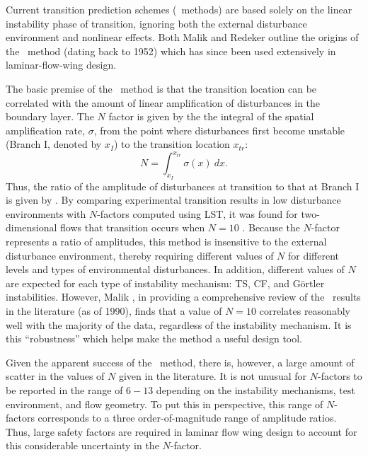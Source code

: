 Current transition prediction schemes (\eton\ methods) are based solely on the
linear instability phase of transition, ignoring both the external disturbance
environment and nonlinear effects.  Both Malik \cite{Malik:90a} and Redeker
\etal \cite{ReHoKoQu:86} outline the origins of the \eton\ method (dating back
to 1952) which has since been used extensively in laminar-flow-wing design.


The basic premise of the \eton\ method is that the transition location can be
correlated with the amount of linear amplification of disturbances in the
boundary layer.  The $N$ factor is given by the the integral of the spatial
amplification rate, $\sigma$, from the point where disturbances first become
unstable (Branch I, denoted by $x_I$) to the transition location $x_{tr}$:
%
\begin{equation}
  N = \int_{x_I}^{x_{tr}} \sigma(x) \ dx .
\end{equation}
%
Thus, the ratio of the amplitude of disturbances at transition to that at
Branch I is given by \eton.  By comparing experimental transition results in
low disturbance environments with $N$-factors computed using LST, it was found
for two-dimensional flows that transition occurs when $N=10$ \cite{JaOkSm:70}.
Because the $N$-factor represents a ratio of amplitudes, this method is
insensitive to the external disturbance environment, thereby requiring
different values of $N$ for different levels and types of environmental
disturbances.  In addition, different values of $N$ are expected for each type
of instability mechanism: TS, CF, and G\"ortler instabilities.  However, Malik
\cite{Malik:90a}, in providing a comprehensive review of the \eton\ results in
the literature (as of 1990), finds that a value of $N=10$ correlates
reasonably well with the majority of the data, regardless of the instability
mechanism.  It is this ``robustness'' which helps make the method a useful
design tool.

Given the apparent success of the \eton\ method, there is, however, a large
amount of scatter in the values of $N$ given in the literature.  It is not
unusual for $N$-factors to be reported in the range of $6-13$ depending on the
instability mechanisms, test environment, and flow geometry.  To put this in
perspective, this range of $N$-factors corresponds to a three
order-of-magnitude range of amplitude ratios.  Thus, large safety factors are
required in laminar flow wing design to account for this considerable
uncertainty in the $N$-factor.

